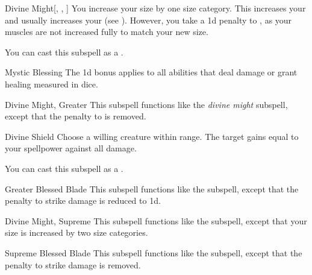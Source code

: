 \begin{ability}[\nth{3}]{Divine Might}[, , ]
You increase your size by one size category.
This increases your  and usually increases your  (see ).
However, you take a \minus1d penalty to , as your muscles are not increased fully to match your new size.

You can cast this subspell as a .
\end{ability}
\vspace{0.25em}


\begin{ability}[\nth{3}]{Mystic Blessing}
The \plus1d bonus applies to all abilities that deal damage or grant healing measured in dice.
\end{ability}
\vspace{0.25em}


\begin{ability}[\nth{6}]{Divine Might, Greater}
This subspell functions like the \textit{divine might} subspell, except that the penalty to  is removed.
\end{ability}
\vspace{0.25em}


\begin{ability}[\nth{6}]{Divine Shield}
Choose a willing creature within \rngclose range.
The target gains  equal to your spellpower against all damage.

You can cast this subspell as a .
\end{ability}
\vspace{0.25em}


\begin{ability}[\nth{6}]{Greater Blessed Blade}
This subspell functions like the  subspell, except that the penalty to strike damage is reduced to \minus1d.
\end{ability}
\vspace{0.25em}


\begin{ability}[\nth{9}]{Divine Might, Supreme}
This subspell functions like the  subspell, except that your size is increased by two size categories.
\end{ability}
\vspace{0.25em}


\begin{ability}[\nth{9}]{Supreme Blessed Blade}
This subspell functions like the  subspell, except that the penalty to strike damage is removed.
\end{ability}
\vspace{0.25em}

